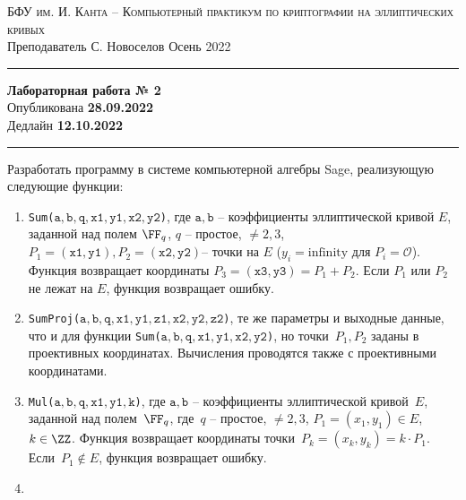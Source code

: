 \documentclass[11pt]{exam}
\theoremstyle{definition}
\begin{document}
	
	{\noindent
		\textsc{БФУ им. И. Канта -- Компьютерный практикум по криптографии на эллиптических кривых }\\[5pt]
		Преподаватель {С. Новоселов}   \hfill{Осень 2022\\}
	\hrule
	\begin{center}
		{\LARGE\textbf{
				Лабораторная работа № 2 \\[5pt]
		}} 
			Опубликована \textbf{28.09.2022} \\[5pt] 
			Дедлайн \textbf{12.10.2022}
		
	\end{center}
	\hrule \vspace{5mm}
	
	\thispagestyle{empty}
	
	Разработать программу в системе компьютерной алгебры Sage, реализующую следующие функции:
	
	\begin{enumerate}
		\item \texttt{Sum($\mathtt{a, b, q,  x1, y1, x2, y2}$)}, где $\mathtt{a, b}$ -- коэффициенты эллиптической кривой $E$, заданной над полем $\FF_q$, $q$ -- простое, $\neq 2,3$, $P_1 = \mathtt{(x1, y1)}, P_2 = \mathtt{(x2, y2)}$-- точки на $E$ ($y_i  = \text{infinity}$ для $P_i = \mathcal{O}$). Функция возвращает координаты $P_3 = \mathtt{(x3, y3)}= P_1 + P_2$. Если $P_1$ или $P_2$ не лежат на $E$, функция возвращает ошибку.
		
		\item \texttt{SumProj($\mathtt{a, b, q,  x1, y1, z1, x2, y2, z2}$)}, те же параметры и выходные данные, что и для функции \texttt{Sum($\mathtt{a, b, q,  x1, y1, x2, y2}$)}, но точки~$P_1, P_2 $ заданы в проективных координатах. Вычисления проводятся  также с проективными координатами.
		
		\item \texttt{Mul($\mathtt{a, b, q,  x1, y1, k}$)}, где $\mathtt{a, b}$ -- коэффициенты эллиптической кривой~$E$, заданной над полем~$\FF_q$, где~$q$ -- простое, $\neq 2,3$, $P_1 = (x_1, y_1) \in E$, $k \in \ZZ$. Функция возвращает координаты точки~$P_k = (x_k, y_k) = k \cdot P_1$. Если~$P_1 \notin E$, функция возвращает ошибку.
		
		\item 
	\end{enumerate}

}
\end{document}
